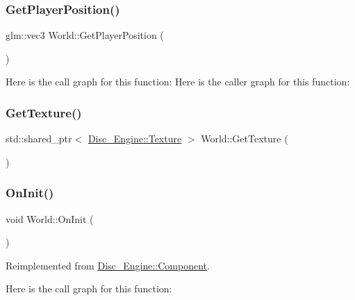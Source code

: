 \mbox{\label{class_world_aa126fb6fe32add15eb789d7920659bb3}} 
\subsubsection{\texorpdfstring{Get\+Player\+Position()}{GetPlayerPosition()}}
{\footnotesize\ttfamily glm\+::vec3 World\+::\+Get\+Player\+Position (\begin{DoxyParamCaption}{ }\end{DoxyParamCaption})}

Here is the call graph for this function\+:
Here is the caller graph for this function\+:
\mbox{\label{class_world_a0bf00237a38156d4c05d51211302328e}} 
\subsubsection{\texorpdfstring{Get\+Texture()}{GetTexture()}}
{\footnotesize\ttfamily std\+::shared\+\_\+ptr$<$ \mbox{\hyperlink{class_disc___engine_1_1_texture}{Disc\+\_\+\+Engine\+::\+Texture}} $>$ World\+::\+Get\+Texture (\begin{DoxyParamCaption}{ }\end{DoxyParamCaption})}

\mbox{\label{class_world_a44b69f8225145de782c9ace28fed6819}} 
\subsubsection{\texorpdfstring{On\+Init()}{OnInit()}}
{\footnotesize\ttfamily void World\+::\+On\+Init (\begin{DoxyParamCaption}{ }\end{DoxyParamCaption})\hspace{0.3cm}{\ttfamily [virtual]}}



Reimplemented from \mbox{\hyperlink{class_disc___engine_1_1_component_a3e79ad90d53b156d2c1d784c6051b2c5}{Disc\+\_\+\+Engine\+::\+Component}}.

Here is the call graph for this function\+:
\mbox{\label{class_world_a0bbbfa3065f37588fa83f7d5533bcd5b}} 
